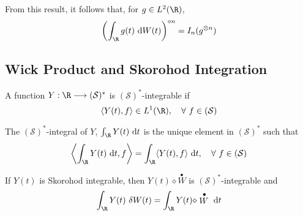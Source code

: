 From this result, it follows that, for $g \in L^2(\R)$,
\[
	\left( \int_\R g(t) ~\mathrm{d}W(t) \right)^{\diamond n} = I_n (g^{\otimes n})
\]

%
%

\subsection*{Wick Product and Skorohod Integration}

\begin{definition}
A function  $Y : \R \longrightarrow (\mathcal{S})^\ast$ is $(\mathcal{S})^\ast$-integrable if 
\[
\langle Y(t), f \rangle \in L^1(\R), \quad \forall~f \in (\mathcal{S})
\]

The $(\mathcal{S})^\ast$-integral of $Y$, $\int_\R Y(t)~\mathrm{d}t$ is the unique element in $(\mathcal{S})^\ast$ such that 
\[
\left\langle \int_\R Y(t)~\mathrm{d}t, f \right\rangle = \int_\R \langle Y(t), f \rangle ~\mathrm{d}t, \quad \forall~f \in (\mathcal{S})
\]
\end{definition}

\begin{theorem}\label{thm:202406051614}
If $Y(t)$ is Skorohod integrable, then $Y(t) \diamond \stackrel{\bullet}{W}$ is $(\mathcal{S})^*$-integrable and
\begin{equation}
\int_\R Y(t) ~\delta W(t) = \int_\R Y(t) \diamond \stackrel{\bullet}{W} ~\mathrm{d}t
\end{equation}
\end{theorem}

